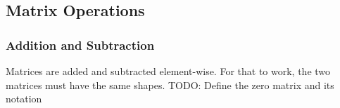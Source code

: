 

\subsection{Matrix Operations}

\subsubsection{Addition and Subtraction}
Matrices are added and subtracted element-wise. For that to work, the two matrices must have the same shapes. TODO: Define the zero matrix and its notation

